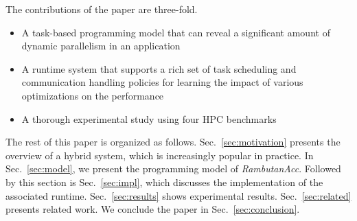 The contributions of the paper are three-fold.
\begin{itemize}
\item A task-based programming model that can reveal a significant amount of dynamic parallelism in an application
\item A runtime system that supports a rich set of task scheduling and communication handling policies for learning the impact of various optimizations on the performance
\item A thorough experimental study using four HPC benchmarks 
\end{itemize}

The rest of this paper is organized as follows.
Sec.~\ref{sec:motivation} presents the overview of a hybrid system, which is increasingly popular in practice.
In Sec.~\ref{sec:model}, we present the programming model of {\em RambutanAcc}.
Followed by this section is Sec.~\ref{sec:impl}, which discusses the implementation of the associated runtime.
Sec.~\ref{sec:results} shows experimental results.
Sec.~\ref{sec:related} presents related work.
We conclude the paper in Sec.~\ref{sec:conclusion}.
